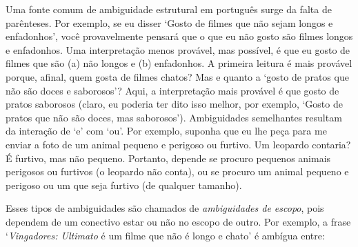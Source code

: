 Uma fonte comum de ambiguidade estrutural em português surge da falta de parênteses. Por exemplo, se eu disser `Gosto de filmes que não sejam longos e enfadonhos', você provavelmente pensará que o que eu não gosto são filmes longos e enfadonhos. Uma interpretação menos provável, mas possível, é que eu gosto de filmes que são (a) não longos e (b) enfadonhos. A primeira leitura é mais provável porque, afinal, quem gosta de filmes chatos? Mas e quanto a `gosto de pratos que não são doces e saborosos'? Aqui, a interpretação mais provável é que gosto de pratos saborosos (claro, eu poderia ter dito isso melhor, por exemplo, `Gosto de pratos que não são doces, mas saborosos'). Ambiguidades semelhantes resultam da interação de `e' com `ou'. Por exemplo, suponha que eu lhe peça para me enviar a foto de um animal pequeno e perigoso ou furtivo. Um leopardo contaria? É furtivo, mas não pequeno. Portanto, depende se procuro pequenos animais perigosos ou furtivos (o leopardo não conta), ou se procuro um animal pequeno e perigoso ou um que seja furtivo (de qualquer tamanho).

Esses tipos de ambiguidades são chamados de \emph{ambiguidades de escopo}, pois dependem de um conectivo estar ou não no escopo de outro. Por exemplo, a frase `\emph{Vingadores: Ultimato} é um filme que não é longo e chato' é ambígua entre:

